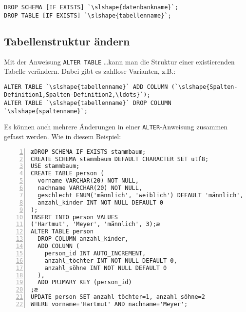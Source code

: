 \begin{lstlisting}
DROP SCHEMA [IF EXISTS] `\slshape{datenbankname}`;
DROP TABLE [IF EXISTS] `\slshape{tabellenname}`;
\end{lstlisting}


\subsection{Tabellenstruktur ändern}

Mit der Anweisung \lstinline{ALTER TABLE} \ldots kann man die Struktur einer
existierenden Tabelle verändern. Dabei gibt es zahllose Varianten, z.B.:

\begin{lstlisting}
ALTER TABLE `\slshape{tabellenname}` ADD COLUMN (`\slshape{Spalten-Definition1,Spalten-Definition2,\ldots}`); 
ALTER TABLE `\slshape{tabellenname}` DROP COLUMN `\slshape{spaltenname}`;
\end{lstlisting}


Es können auch mehrere Änderungen in einer \texttt{ALTER}-Anweisung zusammen
gefasst werden. Wie in diesem Beispiel:

\begin{lstlisting}[numbers=left, xleftmargin=7mm]
æDROP SCHEMA IF EXISTS stammbaum;
CREATE SCHEMA stammbaum DEFAULT CHARACTER SET utf8;
USE stammbaum;
CREATE TABLE person (
  vorname VARCHAR(20) NOT NULL,
  nachname VARCHAR(20) NOT NULL,
  geschlecht ENUM('männlich', 'weiblich') DEFAULT 'männlich', 
  anzahl_kinder INT NOT NULL DEFAULT 0
);
INSERT INTO person VALUES
('Hartmut', 'Meyer', 'männlich', 3);æ
ALTER TABLE person
  DROP COLUMN anzahl_kinder,
  ADD COLUMN (
    person_id INT AUTO_INCREMENT,
    anzahl_töchter INT NOT NULL DEFAULT 0,
    anzahl_söhne INT NOT NULL DEFAULT 0
  ),
  ADD PRIMARY KEY (person_id)
;æ
UPDATE person SET anzahl_töchter=1, anzahl_söhne=2
WHERE vorname='Hartmut' AND nachname='Meyer';
\end{lstlisting}